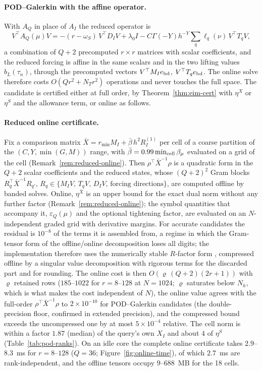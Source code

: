\documentclass[hidelinks]{siamart251216}
\newcommand{\rf}{r}
\begin{document}
\paragraph{POD--Galerkin with the affine operator.}
With $A_Q$ in place of $A_I$ the reduced operator is
\[
V^\top A_Q(\mu)V=-(\rf-\omega_S)\,V^\top D_IV+\lambda_0 I-C\Gamma(-Y)h^{-Y}\sum_q\ell_q(\nu)\,V^\top T_qV,
\]
a combination of $Q+2$ precomputed $r\times r$ matrices with scalar coefficients, and the
reduced forcing is affine in the same scalars and in the two lifting values $b_L(\tau_n)$, through
the precomputed vectors $V^\top M_I e_{\rm bd}$, $V^\top T_q e_{\rm bd}$.  The online solve therefore
costs $O(Qr^2+N_Tr^2)$ operations and never touches the full space.  The candidate is certified
either at full order, by Theorem~\ref{thm:eim-cert} with $\eta^X$ or $\eta^S$ and the allowance
term, or online as follows.

\paragraph{Reduced online certificate.}
Fix a comparison matrix $\bar X=r_{\min}M_I+\bar\beta\,h^2R^{(1)}_I$ per cell of a coarse
partition of the $(C,Y,\min(G,M))$ range, with $\bar\beta=0.99\min_{\rm cell}\beta_\mu$ evaluated on
a grid of the cell (Remark~\ref{rem:reduced-online}).  Then $\rho^\top\bar X^{-1}\rho$ is a quadratic form in the
$Q+2$ scalar coefficients and the reduced states, whose $(Q+2)^2$ Gram blocks
$R_q^\top\bar X^{-1}R_{q'}$, $R_q\in\{M_IV,\,T_qV,\,D_IV,\,\text{forcing directions}\}$, are
computed offline by banded solves.  Online, $\eta^{\bar X}$ is an upper bound for the exact dual norm
without any further factor (Remark~\ref{rem:reduced-online}); the symbol quantities that accompany it, $\varepsilon_Q(\mu)$ and
the optional tightening factor, are evaluated on an $N$-independent graded grid with derivative
margins.  For accurate candidates the residual is $10^{-8}$ of the terms it is assembled from, a
regime in which the Gram-tensor form of the offline/online decomposition loses all digits; the
implementation therefore uses the numerically stable $R$-factor form
\cite{CasenaveErnLelievre2014,BuhrEngwerOhlbergerRave2014}, compressed offline by a singular value
decomposition with rigorous terms for the discarded part and for rounding.  The online cost is then
$O(\varrho\,(Q+2)(2r+1))$ with $\varrho$ retained rows ($185$--$1022$ for $r=8$--$128$ at $N=1024$;
$\varrho$ saturates below $N_h$, which is what makes the cost independent of $N$), the online
value agrees with the full-order $\rho^\top\bar X^{-1}\rho$ to $2\times10^{-10}$ for POD--Galerkin
candidates (the double-precision floor, confirmed in extended precision), and the compressed bound
exceeds the uncompressed one by at most $5\times10^{-4}$ relative.  The cell norm is within a
factor $1.87$ (median) of the query's own $X_I$ and about $4$ of $\eta^S$
(Table~\ref{tab:pod-ranks}).  On an idle core the complete online certificate takes
$2.9$--$8.3$~ms for $r=8$--$128$ ($Q=36$; Figure~\ref{fig:online-time}), of which $2.7$~ms are
rank-independent, and the offline tensors occupy $9$--$688$~MB for the 18 cells.
\end{document}
